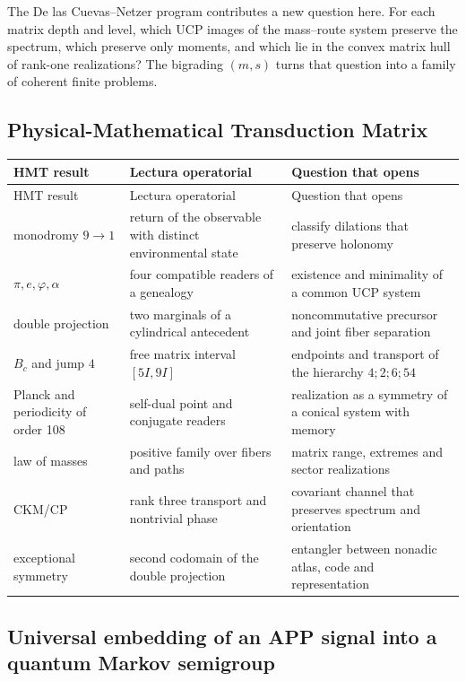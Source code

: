 The De las Cuevas--Netzer program contributes a new question here. For each
matrix depth and level, which UCP images of the mass--route system
preserve the spectrum, which preserve only moments, and which lie
in the convex matrix hull of rank-one realizations? The
bigrading $(m,s)$ turns that question into a family of coherent
finite problems.

\subsection{Physical-Mathematical Transduction Matrix}

\begin{longtable}{@{}L{.23\textwidth}L{.31\textwidth}L{.36\textwidth}@{}}
\toprule
HMT result & Lectura operatorial & Question that opens\\
\midrule
\endfirsthead
\toprule
HMT result & Lectura operatorial & Question that opens\\
\midrule
\endhead
monodromy $9\to1$ & return of the observable with distinct environmental state &
classify dilations that preserve holonomy\\
$\pi,e,\varphi,\alpha$ & four compatible readers of a genealogy &
existence and minimality of a common UCP system\\
double projection & two marginals of a cylindrical antecedent &
noncommutative precursor and joint fiber separation\\
$B_c$ and jump $4$ & free matrix interval $[5I,9I]$ &
endpoints and transport of the hierarchy $4;2;6;54$\\
Planck and periodicity of order 108 & self-dual point and conjugate readers &
realization as a symmetry of a conical system with memory\\
law of masses & positive family over fibers and paths &
matrix range, extremes and sector realizations\\
CKM/CP & rank three transport and nontrivial phase &
covariant channel that preserves spectrum and orientation\\
exceptional symmetry & second codomain of the double projection &
entangler between nonadic atlas, code and representation\\
\bottomrule
\end{longtable}

\subsection{Universal embedding of an APP signal into a quantum Markov semigroup}

